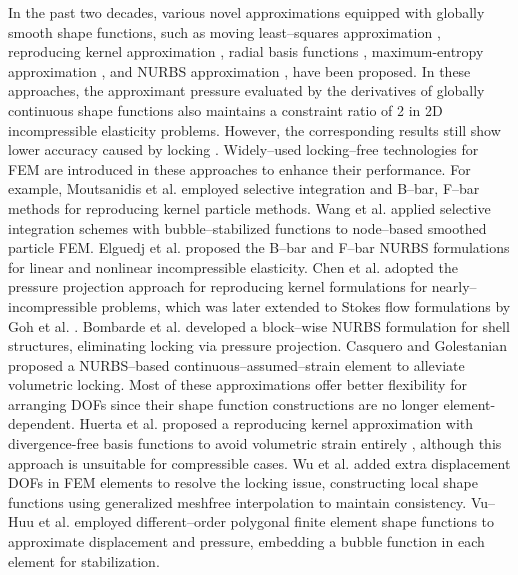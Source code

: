 In the past two decades, various novel approximations equipped with globally smooth shape functions, such as moving least--squares approximation \cite{belytschko1994}, reproducing kernel approximation \cite{liu1995,rodriguez2023}, radial basis functions \cite{chi2014,wang2020}, maximum-entropy approximation \cite{ortiz-bernardin2015}, and NURBS approximation \cite{hughes2005,auricchio2010}, have been proposed.
In these approaches, the approximant pressure evaluated by the derivatives of globally continuous shape functions also maintains a constraint ratio of 2 in 2D incompressible elasticity problems.
However, the corresponding results still show lower accuracy caused by locking \cite{huerta2001,dolbow1999}.
Widely--used locking--free technologies for FEM are introduced in these approaches to enhance their performance.
For example, Moutsanidis et al. \cite{moutsanidis2020,moutsanidis2021} employed selective integration and B--bar, F--bar methods for reproducing kernel particle methods.
Wang et al. \cite{wang2022} applied selective integration schemes with bubble--stabilized functions to node--based smoothed particle FEM.
Elguedj et al. \cite{elguedj2008} proposed the B--bar and F--bar NURBS formulations for linear and nonlinear incompressible elasticity.
Chen et al. \cite{chen2000} adopted the pressure projection approach for reproducing kernel formulations for nearly--incompressible problems, which was later extended to Stokes flow formulations by Goh et al. \cite{goh2018}.
Bombarde et al. \cite{bombarde2022} developed a block--wise NURBS formulation for shell structures, eliminating locking via pressure projection.
Casquero and Golestanian \cite{casquero2024} proposed a NURBS--based continuous--assumed--strain element to alleviate volumetric locking.
Most of these approximations offer better flexibility for arranging DOFs since their shape function constructions are no longer element-dependent.
Huerta et al.\cite{huerta2004} proposed a reproducing kernel approximation with divergence-free basis functions to avoid volumetric strain entirely , although this approach is unsuitable for compressible cases.
Wu et al. \cite{wu2012} added extra displacement DOFs in FEM elements to resolve the locking issue, constructing local shape functions using generalized meshfree interpolation to maintain consistency.
Vu--Huu et al. \cite{vu-huu2019} employed different--order polygonal finite element shape functions to approximate displacement and pressure, embedding a bubble function in each element for stabilization.

